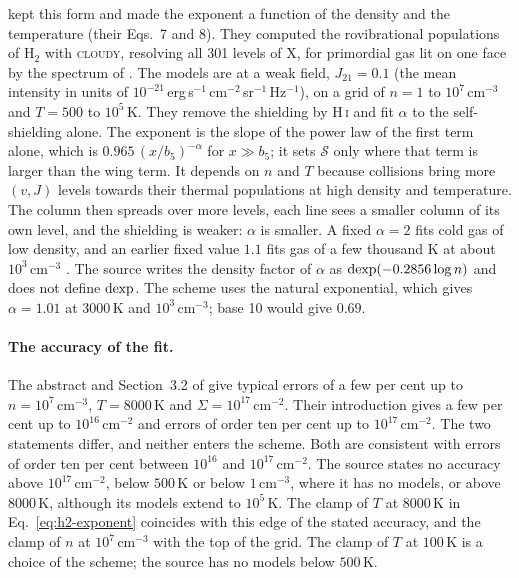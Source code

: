 \citet{WolcottGreenHaiman2019} kept this form and made the exponent a function
of the density and the temperature (their Eqs.~7 and 8). They computed the
rovibrational populations of H$_2$ with \textsc{cloudy}, resolving all 301
levels of X, for primordial gas lit on one face by the spectrum of
\citet{DraineBertoldi1996}. The models are at a weak field, $J_{21}=0.1$ (the
mean intensity in units of
$10^{-21}$\,erg\,s$^{-1}$\,cm$^{-2}$\,sr$^{-1}$\,Hz$^{-1}$), on a grid of
$n=1$ to $10^7$\,cm$^{-3}$ and $T=500$ to $10^5$\,K. They remove the
shielding by H\,\textsc{i} and fit $\alpha$ to the self-shielding alone. The
exponent is the slope of the power law of the first term alone, which is
$0.965\,(x/b_5)^{-\alpha}$ for $x\gg b_5$; it sets $\mathcal S$ only where that
term is larger than the wing term. It depends on $n$ and $T$
because collisions bring more $(v,J)$ levels towards their thermal
populations at high density and temperature. The column then spreads over more
levels, each line sees a smaller column of its own level, and the shielding
is weaker: $\alpha$ is smaller. A fixed $\alpha=2$ fits cold gas of low
density, and an earlier fixed value $1.1$ fits gas of a few thousand K at
about $10^3$\,cm$^{-3}$ \citep{WolcottGreenHaiman2019}.
The source writes the density factor of $\alpha$ as
${\rm dexp}(-0.2856\log n)$ and does not define ${\rm dexp}$. The scheme uses
the natural exponential, which gives $\alpha=1.01$ at $3000$\,K and
$10^3$\,cm$^{-3}$; base 10 would give $0.69$.

\paragraph{The accuracy of the fit.} The abstract and Section~3.2 of
\citet{WolcottGreenHaiman2019} give typical errors of a few per cent up to
$n=10^7$\,cm$^{-3}$, $T=8000$\,K and $\Sigma=10^{17}$\,cm$^{-2}$. Their
introduction gives a few per cent up to $10^{16}$\,cm$^{-2}$ and errors of
order ten per cent up to $10^{17}$\,cm$^{-2}$. The two statements differ, and
neither enters the scheme. Both are consistent with errors of order ten per
cent between $10^{16}$ and $10^{17}$\,cm$^{-2}$.
The source states no accuracy above $10^{17}$\,cm$^{-2}$, below $500$\,K or
below $1$\,cm$^{-3}$, where it has no models, or above $8000$\,K, although its
models extend to $10^5$\,K. The clamp of $T$ at $8000$\,K in
Eq.~\eqref{eq:h2-exponent} coincides with this edge of the stated accuracy,
and the clamp of $n$ at $10^7$\,cm$^{-3}$ with the top of the grid. The clamp of $T$ at $100$\,K
is a choice of the scheme; the source has no models below $500$\,K.

